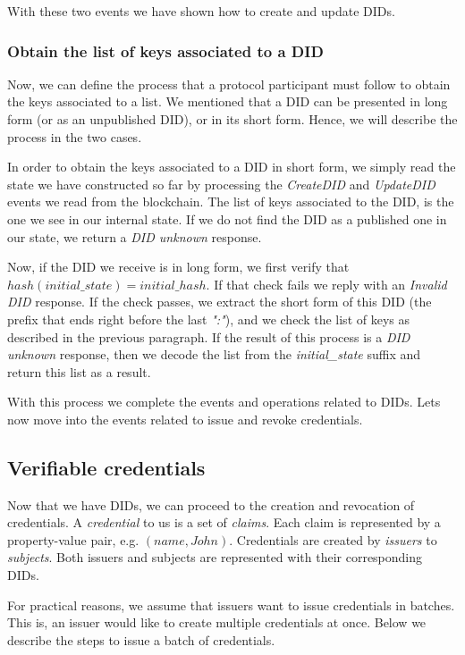 \documentclass[10pt,a4paper]{article}
\begin{document}
With these two events we have shown how to create and update DIDs. 

\subsubsection{Obtain the list of keys associated to a DID}

Now, we can define the process that a protocol participant must follow to obtain the keys associated to a list. 
We mentioned that a DID can be presented in long form (or as an unpublished DID), or in its short form. Hence, we will describe the process in the two cases.

In order to obtain the keys associated to a DID in short form, we simply read the state we have constructed so far by processing the \emph{CreateDID} and \emph{UpdateDID} events we read from the blockchain. The list of keys associated to the DID, is the one we see in our internal state. If we do not find the DID as a published one in our state, we return a \emph{DID unknown} response.

Now, if the DID we receive is in long form, we first verify that $hash(initial\_state) = initial\_hash$. If that check fails we reply with an \emph{Invalid DID} response. If the check passes, we extract the short form of this DID (the prefix that ends right before the last \emph{":"}), and we check the list of keys as described in the previous paragraph. If the result of this process is a \emph{DID unknown} response, then we decode the list from the \emph{initial\_state} suffix and return this list as a result.

With this process we complete the events and operations related to DIDs. 
Lets now move into the events related to issue and revoke credentials.

\subsection{Verifiable credentials}

Now that we have DIDs, we can proceed to the creation and revocation of credentials. A \emph{credential} to us is a set of \emph{claims}. Each claim is represented by a property-value pair, e.g. $(name, John)$. Credentials are created by \emph{issuers} to \emph{subjects}. Both issuers and subjects are represented with their corresponding DIDs. 

For practical reasons, we assume that issuers want to issue credentials in batches. This is, an issuer would like to create multiple credentials at once. Below we describe the steps to issue a batch of credentials.
\end{document}
